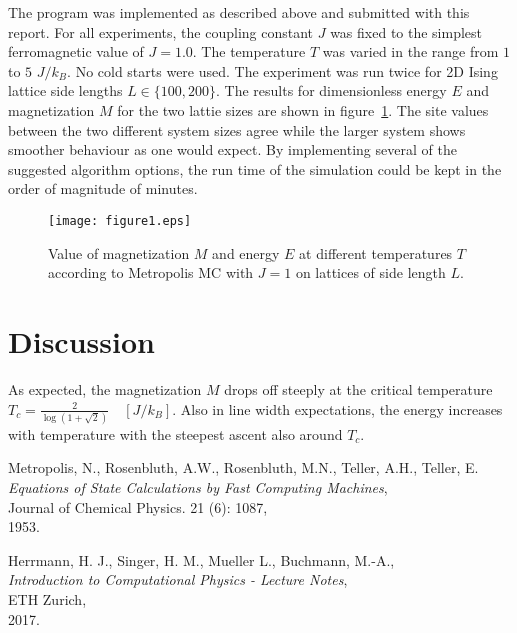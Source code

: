 \documentclass[11pt,a4paper]{article}
\begin{document}
The program was implemented as described above and submitted with this report. 
For all experiments, the coupling constant $J$ was fixed to the simplest ferromagnetic value of $J=1.0$. The temperature $T$
was varied in the range from $1$ to $5$ $J/k_B$. No cold starts were used.
The experiment was run twice for 2D Ising lattice side lengths $L \in \{100, 200\}$. The results for dimensionless energy $E$ and magnetization $M$
 for the two lattie sizes are shown in figure~\ref{fig:1}.
The site values between the two different system sizes agree while the larger system shows smoother behaviour as one would expect.
By implementing several of the suggested algorithm options, the run time of the simulation could be kept
in the order of magnitude of minutes.

\begin{figure}[ht]
\begin{center}
\texttt{[image: figure1.eps]} 
\end{center}
\caption{Value of magnetization $M$ and energy $E$ at different temperatures $T$ according to Metropolis MC with $J=1$ on lattices of side length $L$.}
\label{fig:1}
\end{figure}


\section{Discussion}
As expected, the magnetization $M$ drops off steeply at the critical temperature $T_c = \frac{2}{\log(1+\sqrt{2})} \quad [J/k_B]$.
Also in line width expectations, the energy increases with temperature with the steepest ascent also around $T_c$.





\pagebreak
\begin{thebibliography}{99}


Metropolis, N.,
Rosenbluth, A.W.,
Rosenbluth, M.N.,
Teller, A.H.,
Teller, E.\\
\emph{Equations of State Calculations by Fast Computing Machines},\\
Journal of Chemical Physics. 21 (6): 1087,\\
1953.


	Herrmann, H. J.,
	Singer, H. M.,
	Mueller L.,
	Buchmann, M.-A.,\\
	\emph{Introduction to Computational Physics - Lecture Notes},\\
	ETH Zurich,\\
	2017.


\end{thebibliography}
\end{document}
